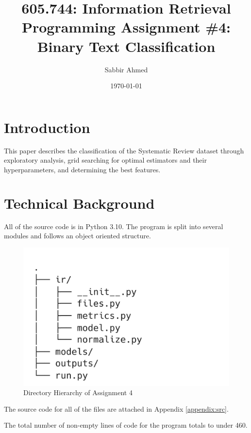 \documentclass[11pt]{article}
\title{605.744: Information Retrieval \\ Programming Assignment \#4: Binary Text Classification}
\author{Sabbir Ahmed}
\date{\today}
\begin{document}
\maketitle	
\tableofcontents
\clearpage
\newpage

\section{Introduction}
This paper describes the classification of the Systematic Review dataset through exploratory analysis, grid searching for optimal estimators and their hyperparameters, and determining the best features.

\section{Technical Background}
All of the source code is in Python 3.10. The program is split into several modules and follows an object oriented structure.


\begin{figure}[!ht]
    \centering
    \includegraphics[trim={0 0 15cm 3cm},clip,scale=0.3]{statics/dirtree.png}
    \caption{Directory Hierarchy of Assignment 4}
\end{figure}

The source code for all of the files are attached in Appendix \ref{appendix:src}.

The total number of non-empty lines of code for the program totals to under 460.
\end{document}
